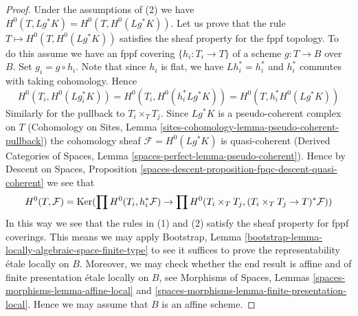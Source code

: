 \begin{proof}
Under the assumptions of (2) we have $H^0(T, Lg^*K) = H^0(T, H^0(Lg^*K))$.
Let us prove that the rule $T \mapsto H^0(T, H^0(Lg^*K))$ satisfies the
sheaf property for the fppf topology. To do this assume we have an
fppf covering $\{h_i : T_i \to T\}$ of a scheme $g : T \to B$ over $B$.
Set $g_i = g \circ h_i$. Note that since $h_i$ is flat, we have
$Lh_i^* = h_i^*$ and $h_i^*$ commutes with taking cohomology. Hence
$$
H^0(T_i, H^0(Lg_i^*K)) =
H^0(T_i, H^0(h_i^*Lg^*K)) =
H^0(T, h_i^*H^0(Lg^*K))
$$
Similarly for the pullback to $T_i \times_T T_j$.
Since $Lg^*K$ is a pseudo-coherent complex on $T$
(Cohomology on Sites, Lemma
\ref{sites-cohomology-lemma-pseudo-coherent-pullback})
the cohomology sheaf $\mathcal{F} = H^0(Lg^*K)$ is quasi-coherent
(Derived Categories of Spaces, Lemma
\ref{spaces-perfect-lemma-pseudo-coherent}).
Hence by Descent on Spaces, Proposition
\ref{spaces-descent-proposition-fpqc-descent-quasi-coherent}
we see that
$$
H^0(T, \mathcal{F}) = \mathop{\mathrm{Ker}}(
\prod H^0(T_i, h_i^*\mathcal{F}) \to
\prod H^0(T_i \times_T T_j, (T_i \times_T T_j \to T)^*\mathcal{F}))
$$
In this way we see that the rules in (1) and (2) satisfy
the sheaf property for fppf coverings. This means we may apply
Bootstrap, Lemma \ref{bootstrap-lemma-locally-algebraic-space-finite-type}
to see it suffices to prove the representability \'etale locally on $B$.
Moreover, we may check whether the end result is affine and
of finite presentation \'etale locally on $B$, see
Morphisms of Spaces, Lemmas \ref{spaces-morphisms-lemma-affine-local} and
\ref{spaces-morphisms-lemma-finite-presentation-local}.
Hence we may assume that $B$ is an affine scheme.


\end{proof}
